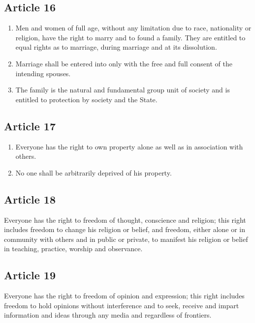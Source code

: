 \documentclass[
  titlepage,
  openright,
  DIV=calc,
  toc=listof,
  listof=nochaptergap]{scrbook}
\begin{document}
\subsection{Article 16}\label{article-16-4}

\begin{enumerate}
\def\labelenumi{\arabic{enumi}.}
\item
  Men and women of full age, without any limitation due to race,
  nationality or religion, have the right to marry and to found a
  family. They are entitled to equal rights as to marriage, during
  marriage and at its dissolution.
\item
  Marriage shall be entered into only with the free and full consent of
  the intending spouses.
\item
  The family is the natural and fundamental group unit of society and is
  entitled to protection by society and the State.
\end{enumerate}

\subsection{Article 17}\label{article-17-4}

\begin{enumerate}
\def\labelenumi{\arabic{enumi}.}
\item
  Everyone has the right to own property alone as well as in association
  with others.
\item
  No one shall be arbitrarily deprived of his property.
\end{enumerate}

\subsection{Article 18}\label{article-18-4}

Everyone has the right to freedom of thought, conscience and religion;
this right includes freedom to change his religion or belief, and
freedom, either alone or in community with others and in public or
private, to manifest his religion or belief in teaching, practice,
worship and observance.

\subsection{Article 19}\label{article-19-4}

Everyone has the right to freedom of opinion and expression; this right
includes freedom to hold opinions without interference and to seek,
receive and impart information and ideas through any media and
regardless of frontiers.
\end{document}
